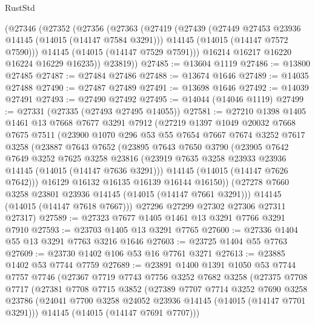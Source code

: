 \begin{lexlean}{RustStd}
\begin{coremodule}
    (@27346
      (@27352
        (@27356
          (@27363
            (@27419
              (@27439
                (@27449 @27453 @23936 @14145 (@14015 (@14147 @7584 @3291)))
                @14145
                (@14015 (@14147 @7572 @7590)))
              @14145
              (@14015 (@14147 @7529 @7591)))
            @16214
            @16217
            @16220
            @16224
            @16229
            @16235))
        @23819))
@27485 := @13604 @1119
@27486 := @13800 @27485
@27487 := @27484 @27486
@27488 := @13674 @1646
@27489 := @14035 @27488
@27490 := @27487 @27489
@27491 := @13698 @1646
@27492 := @14039 @27491
@27493 := @27490 @27492
@27495 := @14044 (@14046 @1119)
@27499 := @27331 (@27335 (@27493 @27495 @14055))
@27581 := @27210
    @1398
    @1405
    @1461
    @13
    @7668
    @7677
    @3291
    @7912
    (@27219
      @1397
      @1049
      @20032
      @7668
      @7675
      @7511
      (@23900
        @1070
        @296
        @53
        @55
        @7654
        @7667
        @7674
        @3252
        @7617
        @3258
        (@23887
          @7643
          @7652
          (@23895
            @7643
            @7650
            @3790
            (@23905
              @7642
              @7649
              @3252
              @7625
              @3258
              @23816
              (@23919 @7635 @3258 @23933 @23936 @14145 (@14015 (@14147 @7636 @3291)))
              @14145
              (@14015 (@14147 @7626 @7642)))
            @16129
            @16132
            @16135
            @16139
            @16144
            @16150))
        (@27278 @7660 @3258 @23801 @23936 @14145 (@14015 (@14147 @7661 @3291)))
        @14145
        (@14015 (@14147 @7618 @7667)))
      @27296
      @27299
      @27302
      @27306
      @27311
      @27317)
@27589 := @27323 @7677 @1405 @1461 @13 @3291 @7766 @3291 @7910
@27593 := @23703 @1405 @13 @3291 @7765
@27600 := @27336 @1404 @55 @13 @3291 @7763 @3216 @1646
@27603 := @23725 @1404 @55 @7763
@27609 := @23730 @1402 @106 @53 @16 @7761 @3271
@27613 := @23885 @1402 @53 @7744 @7759
@27689 := @23891
    @1400
    @1391
    @1050
    @53
    @7744
    @7757
    @7746
    (@27367
      @7719
      @7743
      @7756
      @3252
      @7682
      @3258
      (@27375
        @7708
        @7717
        (@27381
          @7708
          @7715
          @3852
          (@27389
            @7707
            @7714
            @3252
            @7690
            @3258
            @23786
            (@24041 @7700 @3258 @24052 @23936 @14145 (@14015 (@14147 @7701 @3291)))
            @14145
            (@14015 (@14147 @7691 @7707)))

\end{coremodule}
\end{lexlean}
